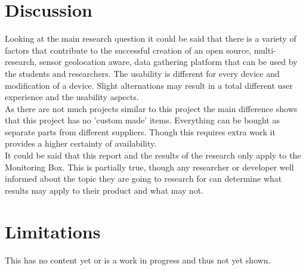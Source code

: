 \documentclass[conference]{IEEEtran}
\begin{document}
\section{Discussion}
	Looking at the main research question it could be said that there is a variety of factors that contribute to the successful creation of an open source, multi-research, sensor geolocation aware, data gathering platform that can be used by the students and researchers. The usability is different for every device and modification of a device. Slight alternations may result in a total different user experience and the usability aspects. \\
	As there are not much projects similar to this project the main difference shows that this project has no 'custom made' items. Everything can be bought as separate parts from different suppliers. Though this requires extra work it provides a higher certainty of availability. \\
	It could be said that this report and the results of the research only apply to the Monitoring Box. This is partially true, though any researcher or developer well informed about the topic they are going to research for can determine what results may apply to their product and what may not.

\section{Limitations}
	This has no content yet or is a work in progress and thus not yet shown.



\end{document}

